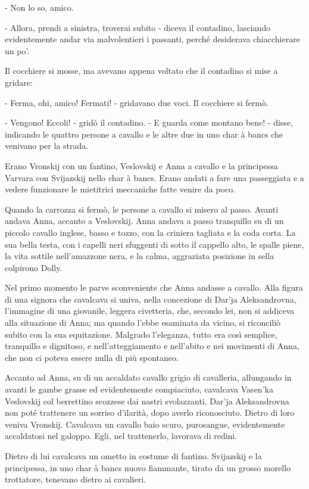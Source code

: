 - Non lo so, amico. 

- Allora, prendi a sinistra, troverai subito - diceva il contadino, lasciando evidentemente andar via malvolentieri i passanti, perché desiderava chiacchierare un po'. 

Il cocchiere si mosse, ma avevano appena voltato che il contadino si mise a gridare: 

- Ferma, ohi, amico! Fermati! - gridavano due voci. Il cocchiere si fermò. 

- Vengono! Eccoli! - gridò il contadino. - E guarda come montano bene! - disse, indicando le quattro persone a cavallo e le altre due in uno char à bancs che venivano per la strada. 

Erano Vronskij con un fantino, Veslovskij e Anna a cavallo e la principessa Varvara con Svijazskij nello char à bancs. Erano andati a fare una passeggiata e a vedere funzionare le mietitrici meccaniche fatte venire da poco. 

Quando la carrozza si fermò, le persone a cavallo si misero al passo. Avanti andava Anna, accanto a Veslovskij. Anna andava a passo tranquillo su di un piccolo cavallo inglese, basso e tozzo, con la criniera tagliata e la coda corta. La sua bella testa, con i capelli neri sfuggenti di sotto il cappello alto, le spalle piene, la vita sottile nell'amazzone nera, e la calma, aggraziata posizione in sella colpirono Dolly. 

Nel primo momento le parve sconveniente che Anna andasse a cavallo. Alla figura di una signora che cavalcava si univa, nella concezione di Dar'ja Aleksandrovna, l'immagine di una giovanile, leggera civetteria, che, secondo lei, non si addiceva alla situazione di Anna; ma quando l'ebbe esaminata da vicino, si riconciliò subito con la sua equitazione. Malgrado l'eleganza, tutto era così semplice, tranquillo e dignitoso, e nell'atteggiamento e nell'abito e nei movimenti di Anna, che non ci poteva essere nulla di più spontaneo. 

Accanto ad Anna, su di un accaldato cavallo grigio di cavalleria, allungando in avanti le gambe grasse ed evidentemente compiaciuto, cavalcava Vasen'ka Veslovskij col berrettino scozzese dai nastri svolazzanti. Dar'ja Aleksandrovna non poté trattenere un sorriso d'ilarità, dopo averlo riconosciuto. Dietro di loro veniva Vronskij. Cavalcava un cavallo baio scuro, purosangue, evidentemente accaldatosi nel galoppo. Egli, nel trattenerlo, lavorava di redini. 

Dietro di lui cavalcava un ometto in costume di fantino. Svijazskij e la principessa, in uno char à bancs nuovo fiammante, tirato da un grosso morello trottatore, tenevano dietro ai cavalieri. 


